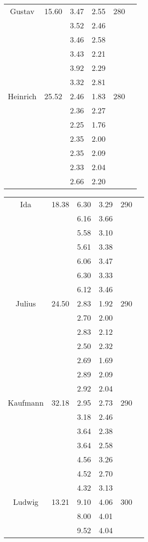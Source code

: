 \begin{table}
\begin{tabular}{cccccc}
	\hline
	Gustav & 15.60 & 3.47 & 2.55 & 280 & \\
	& & 3.52 & 2.46 & & \\
	& & 3.46 & 2.58 & & \\
	& & 3.43 & 2.21 & & \\
	& & 3.92 & 2.29 & & \\
	& & 3.32 & 2.81 & & \\
	\hline
	Heinrich & 25.52 & 2.46 & 1.83 & 280 & \\
	& & 2.36 & 2.27 & & \\
	& & 2.25 & 1.76 & & \\
	& & 2.35 & 2.00 & & \\
	& & 2.35 & 2.09 & & \\
	& & 2.33 & 2.04 & & \\
	& & 2.66 & 2.20 & & \\
	\hline
\end{tabular}
\begin{tabular}{cccccc}
	\hline
	Ida & 18.38 & 6.30 & 3.29 & 290 & \\
	& & 6.16 & 3.66 & & \\
	& & 5.58 & 3.10 & & \\
	& & 5.61 & 3.38 & & \\
	& & 6.06 & 3.47 & & \\
	& & 6.30 & 3.33 & & \\
	& & 6.12 & 3.46 & & \\
	\hline
	Julius & 24.50 & 2.83 & 1.92 & 290 & \\
	& & 2.70 & 2.00 & & \\
	& & 2.83 & 2.12 & & \\
	& & 2.50 & 2.32 & & \\
	& & 2.69 & 1.69 & & \\
	& & 2.89 & 2.09 & & \\
	& & 2.92 & 2.04 & & \\
	\hline
	Kaufmann & 32.18 & 2.95 & 2.73 & 290 & \\
	& & 3.18 & 2.46 & & \\
	& & 3.64 & 2.38 & & \\
	& & 3.64 & 2.58 & & \\
	& & 4.56 & 3.26 & & \\
	& & 4.52 & 2.70 & & \\
	& & 4.32 & 3.13 & & \\
	\hline
	Ludwig & 13.21 & 9.10 & 4.06 & 300 & \\
	& & 8.00 & 4.01 & & \\
	& & 9.52 & 4.04 & & \\

\end{tabular}
\end{table}
